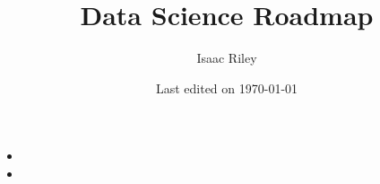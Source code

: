 \documentclass[a4, 12pt]{article}
\title{Data Science Roadmap}
\author{Isaac Riley}
\date{Last edited on \today}
\begin{document}
\maketitle
\begin{itemize}
    \item 
    \item 
\end{itemize}
\end{document}
